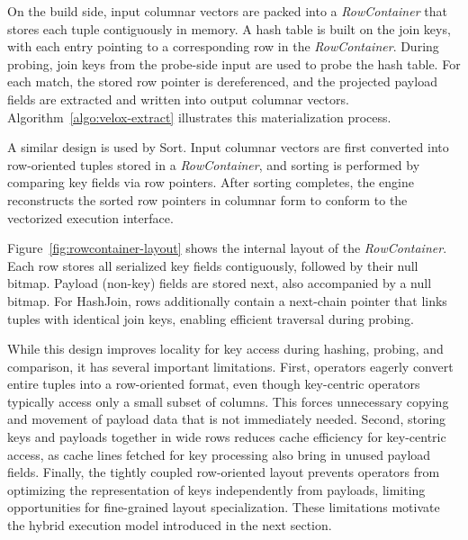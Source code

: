 On the build side, input columnar vectors are packed into a \emph{RowContainer} that stores each tuple contiguously in memory.
A hash table is built on the join keys, with each entry pointing to a corresponding row in the \emph{RowContainer}.
During probing, join keys from the probe-side input are used to probe the hash table.
For each match, the stored row pointer is dereferenced, and the projected payload fields are extracted and written into output columnar vectors.
Algorithm~\ref{algo:velox-extract} illustrates this materialization process.

A similar design is used by Sort.
Input columnar vectors are first converted into row-oriented tuples stored in a \emph{RowContainer}, and sorting is performed by comparing key fields via row pointers.
After sorting completes, the engine reconstructs the sorted row pointers in columnar form to conform to the vectorized execution interface.

Figure~\ref{fig:rowcontainer-layout} shows the internal layout of the \emph{RowContainer}.
Each row stores all serialized key fields contiguously, followed by their null bitmap.
Payload (non-key) fields are stored next, also accompanied by a null bitmap.
For HashJoin, rows additionally contain a next-chain pointer that links tuples with identical join keys, enabling efficient traversal during probing.

While this design improves locality for key access during hashing, probing, and comparison, it has several important limitations.
First, operators eagerly convert entire tuples into a row-oriented format, even though key-centric operators typically access only a small subset of columns.
This forces unnecessary copying and movement of payload data that is not immediately needed.
Second, storing keys and payloads together in wide rows reduces cache efficiency for key-centric access, as cache lines fetched for key processing also bring in unused payload fields.
Finally, the tightly coupled row-oriented layout prevents operators from optimizing the representation of keys independently from payloads, limiting opportunities for fine-grained layout specialization.
These limitations motivate the hybrid execution model introduced in the next section.

\begin{algorithm}[t]
\caption{Original columnar materialization from a row-oriented layout in \proj.}
\label{algo:velox-extract}
\end{algorithm}


